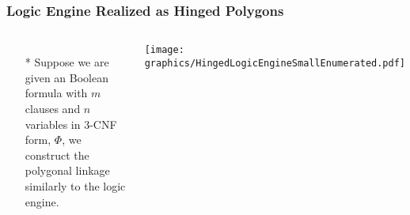 \documentclass{beamer}
\begin{document}
\begin{frame} \frametitle{Logic Engine Realized as Hinged Polygons}
    \begin{columns}[c]
        \begin{itemize}
            \item[*] Suppose we are given an Boolean formula with $m$ clauses and $n$ variables in 3-CNF form, $\Phi$, we construct the polygonal linkage similarly to the logic engine.
        \end{itemize}
        \begin{minipage}{\linewidth}
            \begin{center}
            \texttt{[image: graphics/HingedLogicEngineSmallEnumerated.pdf]}
            \end{center}
        \end{minipage}
    \end{columns}
\end{frame}

\end{document}

